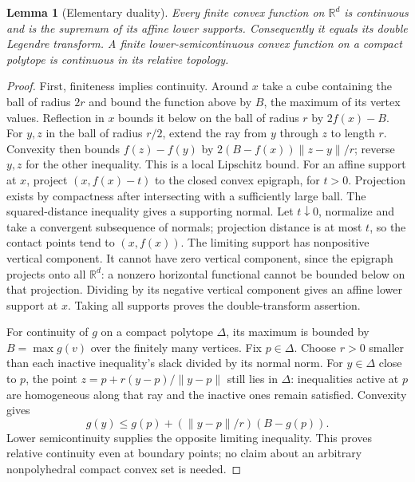 \documentclass[11pt]{article}
\newtheorem{lemma}[theorem]{Lemma}
\theoremstyle{definition}\newtheorem{definition}[theorem]{Definition}
\theoremstyle{remark}\newtheorem{remark}[theorem]{Remark}
\newcommand{\R}{\mathbb R}\newcommand{\Q}{\mathbb Q}\newcommand{\Z}{\mathbb Z}
\begin{document}
\begin{lemma}[Elementary duality]\label{lem:duality}
Every finite convex function on $\R^d$ is continuous and is the supremum of its affine lower supports. Consequently it equals its double Legendre transform. A finite lower-semicontinuous convex function on a compact polytope is continuous in its relative topology.
\end{lemma}
\begin{proof}
First, finiteness implies continuity. Around $x$ take a cube containing the ball of radius $2r$ and bound the function above by $B$, the maximum of its vertex values. Reflection in $x$ bounds it below on the ball of radius $r$ by $2f(x)-B$. For $y,z$ in the ball of radius $r/2$, extend the ray from $y$ through $z$ to length $r$. Convexity then bounds $f(z)-f(y)$ by $2(B-f(x))\|z-y\|/r$; reverse $y,z$ for the other inequality. This is a local Lipschitz bound. For an affine support at $x$, project $(x,f(x)-t)$ to the closed convex epigraph, for $t>0$. Projection exists by compactness after intersecting with a sufficiently large ball. The squared-distance inequality gives a supporting normal. Let $t\downarrow0$, normalize and take a convergent subsequence of normals; projection distance is at most $t$, so the contact points tend to $(x,f(x))$. The limiting support has nonpositive vertical component. It cannot have zero vertical component, since the epigraph projects onto all $\R^d$: a nonzero horizontal functional cannot be bounded below on that projection. Dividing by its negative vertical component gives an affine lower support at $x$. Taking all supports proves the double-transform assertion.

For continuity of $g$ on a compact polytope $\Delta$, its maximum is bounded by $B=\max g(v)$ over the finitely many vertices. Fix $p\in\Delta$. Choose $r>0$ smaller than each inactive inequality's slack divided by its normal norm. For $y\in\Delta$ close to $p$, the point $z=p+r(y-p)/\|y-p\|$ still lies in $\Delta$: inequalities active at $p$ are homogeneous along that ray and the inactive ones remain satisfied. Convexity gives
\[
 g(y)\leq g(p)+(\|y-p\|/r)(B-g(p)).
\]
Lower semicontinuity supplies the opposite limiting inequality. This proves relative continuity even at boundary points; no claim about an arbitrary nonpolyhedral compact convex set is needed.
\end{proof}
\end{document}
